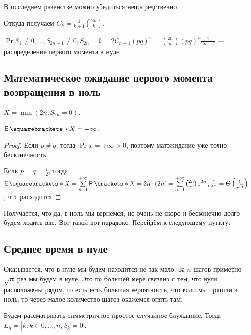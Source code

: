 В последнем равенстве можно убедиться непосредственно.

Откуда получаем $C_k = \frac{1}{k + 1}\binom{2k}{k}$.

\begin{remark}
  $\Pr{S_1 \neq 0, \ldots, S_{2n - 1} \neq 0, S_{2n} = 0} = 2C_{n - 1}(pq)^n =
  \binom{2n}{n}(pq)^n\frac{1}{2n - 1}$ --- распределение первого момента в нуле.
\end{remark}

\subsection{Математическое ожидание первого момента возвращения в ноль}

\begin{definition}
  $X = \min(2n : S_{2n} = 0)$.
\end{definition}

\begin{theorem}
  $\E{X} = +\infty$.
\end{theorem}

\begin{proof}
  Если $p \neq q$, тогда $\Pr{x = +\infty} > 0$, поэтому матожидание уже
  точно бесконечность.

  Если $p = q = \frac{1}{2}$, тогда $\E{X} = \sum\limits_{n = 1}^{+\infty}
  \Pr{X = 2n}\cdot (2n) = \sum\limits_{n = 1}^{+\infty} \binom{2n}{n} 
  \frac{2n}{2n - 1}\frac{1}{4^n} = \Theta\left(\frac{1}{\sqrt{n}}\right)$, что расходится
\end{proof}

Получается, что да, в ноль мы вернемся, но очень не скоро и бесконечно долго будем
ходить вне. Вот такой вот парадокс. Перейдём к следующему пункту.

\subsection{Среднее время в нуле}

Оказывается, что в нуле мы будем находится не так мало. За $n$ шагов примерно
$\sqrt{n}$ раз мы будем в нуле. Это по большей мере связано с тем, что нули
расположены рядом, то есть есть большая вероятность, что если мы пришли в ноль,
то через малое количество шагов окажемся опять там.

\begin{definition}
  Будем рассматривать симметричное простое случайное блуждание. Тогда 
  $L_n = \left|k : k \in \overline{0, \ldots, n}, S_k = 0\right|$.
\end{definition}

